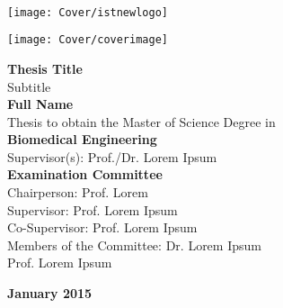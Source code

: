 \setcounter{page}{1} 


\thispagestyle{empty}
\begin{flushleft} ~\\ \vspace{-12mm} \hspace{-12mm}  \texttt{[image: Cover/istnewlogo]} 
\vspace{10mm}
\\ \begin{center} \texttt{[image: Cover/coverimage]}  \end{center} %
 \vspace{5mm}
\centering
\LARGE \textbf{Thesis Title}
\\ \vspace{10mm}
\Large Subtitle
\\ \vspace{15mm}
\Large \textbf{Full Name} \\
\vspace{12mm}
\large Thesis to obtain the Master of Science Degree in
\\ \vspace{2mm}
\LARGE \textbf{Biomedical Engineering}
\\ \vspace{10mm}
\large Supervisor(s): Prof./Dr. Lorem Ipsum
\\ \vspace{15mm}
\Large \textbf{Examination Committee}
\\ \vspace{5mm}
\large Chairperson:	Prof. Lorem \\
\large Supervisor: Prof. Lorem Ipsum\\
\large Co-Supervisor: Prof. Lorem Ipsum \\
\large Members of the Committee: Dr. Lorem Ipsum \\
Prof. Lorem Ipsum
 
\vspace{15mm}

\Large \textbf{January 2015} \\
\let\thepage\relax
\end{flushleft}
\pagebreak


\clearpage

\thispagestyle{empty}
\cleardoublepage

\setcounter{page}{1} 

\baselineskip 18pt %
